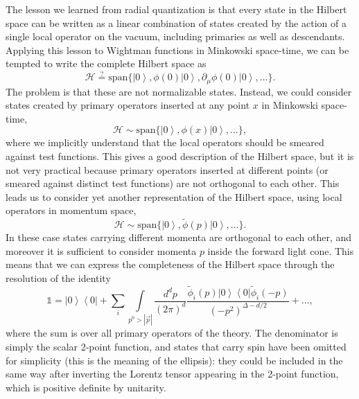 \documentclass[a4paper,12pt]{article}
\newcommand{\ket}[1]{\left| #1 \right\rangle}
\newcommand{\bra}[1]{\left\langle #1 \right|}
\numberwithin{equation}{section}
\begin{document}
The lesson we learned from radial quantization is that every state in the Hilbert space can be written as a linear combination of states created by the action of a single local operator on the vacuum, including primaries as well as descendants. Applying this lesson to Wightman functions in Minkowski space-time, we can be tempted to write the complete Hilbert space as
\begin{equation}
	\mathscr{H} \stackrel{?}{=} \text{span}\big\{
	\ket{0}, 
	\phi(0) \ket{0}, 
	\partial_\mu \phi(0) \ket{0}, 
	\ldots
	\big\}.
	\label{eq:localstates}
\end{equation}
The problem is that these are not normalizable states. Instead, we could consider states created by primary operators inserted at any point $x$ in Minkowski space-time,
\begin{equation}
	\mathscr{H} \sim \text{span}\big\{
	\ket{0}, 
	\phi(x) \ket{0}, 
	\ldots
	\big\},
\end{equation}
where we implicitly understand that the local operators should be smeared against test functions. This gives a good description of the Hilbert space, but it is not very practical because primary operators inserted at different points (or smeared against distinct test functions) are not orthogonal to each other.
This leads us to consider yet another representation of the Hilbert space, using local operators in momentum space,
\begin{equation}
	\mathscr{H} \sim \text{span}\big\{
	\ket{0}, 
	\widetilde{\phi}(p) \ket{0}, 
	\ldots
	\big\}.
\end{equation}
In these case states carrying different momenta are orthogonal to each other, and moreover it is sufficient to consider momenta $p$ inside the forward light cone.
This means that we can express the completeness of the Hilbert space through the resolution of the identity
\begin{equation}
	\mathds{1} = \ket{0} \bra{0}
	+ \sum_i \int\limits_{p^0 > \left| \vec{p} \right|} \!\! 
	\frac{d^dp}{(2\pi)^d}
	\frac{\widetilde{\phi}_i(p) \ket{0} \bra{0} \widetilde{\phi}_i(-p) }
	{(-p^2)^{\Delta - d/2}}
	+ \ldots,
\end{equation}
where the sum is over all primary operators of the theory.
The denominator is simply the scalar 2-point function, and states that carry spin have been omitted for simplicity (this is the meaning of the ellipsis): they could be included in the same way after inverting the  Lorentz tensor appearing in the 2-point function, which is positive definite by unitarity.
\end{document}
